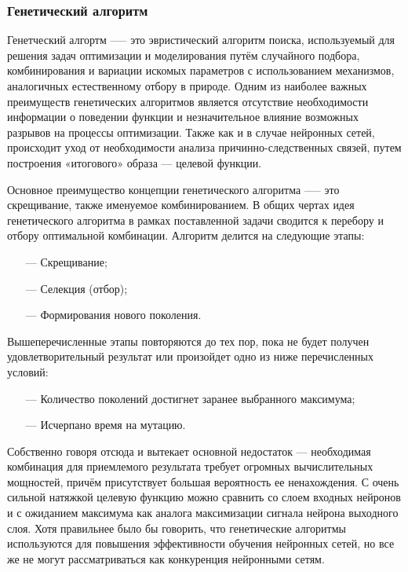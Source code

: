 \subsubsection{Генетический алгоритм}



\par Генетческий алгортм --— это эвристический алгоритм поиска, используемый для решения задач оптимизации и моделирования путём случайного подбора, комбинирования и вариации искомых параметров с использованием механизмов, аналогичных естественному отбору в природе. Одним из наиболее важных преимуществ генетических алгоритмов является отсутствие необходимости информации о поведении функции и незначительное влияние возможных разрывов на процессы оптимизации. Также как и в случае нейронных сетей, происходит уход от необходимости анализа причинно-следственных связей, путем построения «итогового» образа — целевой функции.

\par Основное преимущество концепции генетического алгоритма —-- это скрещивание, также именуемое комбинированием. В общих чертах идея генетического алгоритма в рамках поставленной задачи сводится к перебору и отбору оптимальной комбинации. Алгоритм делится на следующие этапы:

\begin{itemize}[leftmargin=1.6\parindent]
	\item[---] Скрещивание;
	\item[---] Селекция (отбор);
	\item[---] Формирования нового поколения.
\end{itemize}

\par Вышеперечисленные этапы повторяются до тех пор, пока не будет получен удовлетворительный результат или произойдет одно из ниже перечисленных условий:

\begin{itemize}[leftmargin=1.6\parindent]
	\item[---] Количество поколений достигнет заранее выбранного максимума;
	\item[---] Исчерпано время на мутацию.
\end{itemize}

\par Собственно говоря отсюда и вытекает основной недостаток --- необходимая комбинация для приемлемого результата требует огромных вычислительных мощностей, причём присутствует большая вероятность ее ненахождения. С очень сильной натяжкой целевую функцию можно сравнить со слоем входных нейронов и с ожиданием максимума как аналога максимизации сигнала нейрона выходного слоя. Хотя правильнее было бы говорить, что генетические алгоритмы используются для повышения эффективности обучения нейронных сетей, но все же не могут рассматриваться как конкуренция нейронными сетям.



